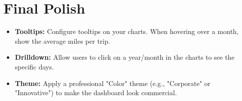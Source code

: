 \section{Final Polish}
\begin{itemize}
    \item \textbf{Tooltips:} Configure tooltips on your charts. When hovering over a month, show the average miles per trip.
    \item \textbf{Drilldown:} Allow users to click on a year/month in the charts to see the specific days.
    \item \textbf{Theme:} Apply a professional "Color" theme (e.g., "Corporate" or "Innovative") to make the dashboard look commercial.
\end{itemize}